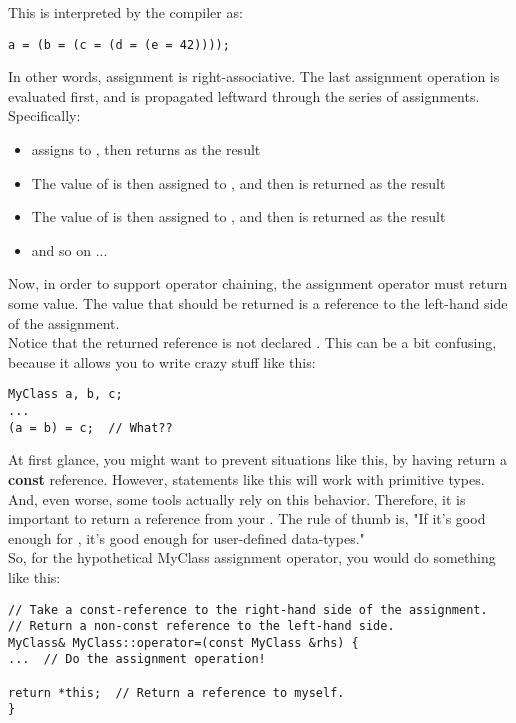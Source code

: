 This is interpreted by the compiler as:\\
\begin{verbatim}
a = (b = (c = (d = (e = 42))));
\end{verbatim}

In other words, assignment is right-associative. The last assignment operation is evaluated first, and is propagated leftward through the series of assignments. Specifically:

\begin{itemize}
\tightlist
    \item {} assigns  to , then returns  as the result
    \item The value of  is then assigned to , and then  is returned as the result
    \item The value of  is then assigned to , and then  is returned as the result
    \item and so on ...
\end{itemize}

Now, in order to support operator chaining, the assignment operator must return some value. The value that should be returned is a reference to the left-hand side of the assignment.\\

Notice that the returned reference is not declared . This can be a bit confusing, because it allows you to write crazy stuff like this:

\begin{verbatim}
MyClass a, b, c;
...
(a = b) = c;  // What??
\end{verbatim}

At first glance, you might want to prevent situations like this, by having  return a \textbf{const} reference. However, statements like this will work with primitive types. And, even worse, some tools actually rely on this behavior. Therefore, it is important to return a  reference from your . The rule of thumb is, "If it's good enough for , it's good enough for user-defined data-types."\\

So, for the hypothetical MyClass assignment operator, you would do something like this:

\begin{verbatim}
// Take a const-reference to the right-hand side of the assignment.
// Return a non-const reference to the left-hand side.
MyClass& MyClass::operator=(const MyClass &rhs) {
...  // Do the assignment operation!

return *this;  // Return a reference to myself.
}
\end{verbatim}

